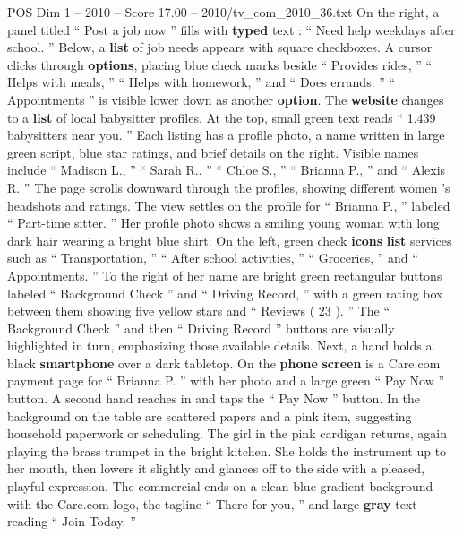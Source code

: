 \begin{textsample}{POS Dim 1 – 2010 – Score 17.00 – 2010/tv\_com\_2010\_36.txt}
On the right, a panel titled “ Post a job now ” fills with \textbf{typed} text : “ Need help weekdays after school. ” Below, a \textbf{list} of job needs appears with square checkboxes.
A cursor clicks through \textbf{options}, placing blue check marks beside “ Provides rides, ” “ Helps with meals, ” “ Helps with homework, ” and “ Does errands. ” “ Appointments ” is visible lower down as another \textbf{option}.
The \textbf{website} changes to a \textbf{list} of local babysitter profiles.
At the top, small green text reads “ 1,439 babysitters near you. ” Each listing has a profile photo, a name written in large green script, blue star ratings, and brief details on the right.
Visible names include “ Madison L., ” “ Sarah R., ” “ Chloe S., ” “ Brianna P., ” and “ Alexis R. ” The page scrolls downward through the profiles, showing different women ’s headshots and ratings.
The view settles on the profile for “ Brianna P., ” labeled “ Part-time sitter. ” Her profile photo shows a smiling young woman with long dark hair wearing a bright blue shirt.
On the left, green check \textbf{icons} \textbf{list} services such as “ Transportation, ” “ After school activities, ” “ Groceries, ” and “ Appointments. ” To the right of her name are bright green rectangular buttons labeled “ Background Check ” and “ Driving Record, ” with a green rating box between them showing five yellow stars and “ Reviews ( 23 ). ” The “ Background Check ” and then “ Driving Record ” buttons are visually highlighted in turn, emphasizing those available details.
Next, a hand holds a black \textbf{smartphone} over a dark tabletop.
On the \textbf{phone} \textbf{screen} is a Care.com payment page for “ Brianna P. ” with her photo and a large green “ Pay Now ” button.
A second hand reaches in and taps the “ Pay Now ” button.
In the background on the table are scattered papers and a pink item, suggesting household paperwork or scheduling.
The girl in the pink cardigan returns, again playing the brass trumpet in the bright kitchen.
She holds the instrument up to her mouth, then lowers it slightly and glances off to the side with a pleased, playful expression.
The commercial ends on a clean blue gradient background with the Care.com logo, the tagline “ There for you, ” and large \textbf{gray} text reading “ Join Today. ”

\end{textsample}
